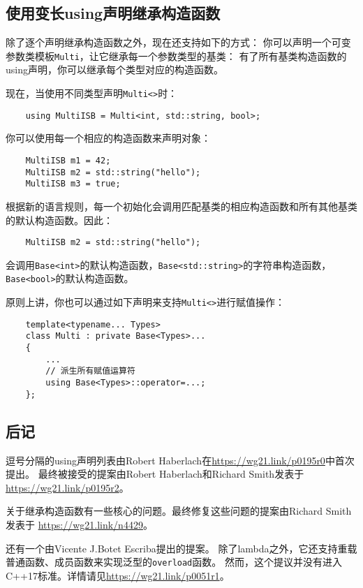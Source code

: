 \subsection{使用变长using声明继承构造函数}
除了逐个声明继承构造函数之外，现在还支持如下的方式：
你可以声明一个可变参数类模板\texttt{Multi}，让它继承每一个参数类型的基类：
有了所有基类构造函数的using声明，你可以继承每个类型对应的构造函数。

现在，当使用不同类型声明\texttt{Multi<>}时：
\begin{lstlisting}
    using MultiISB = Multi<int, std::string, bool>;
\end{lstlisting}
你可以使用每一个相应的构造函数来声明对象：
\begin{lstlisting}
    MultiISB m1 = 42;
    MultiISB m2 = std::string("hello");
    MultiISB m3 = true;
\end{lstlisting}
根据新的语言规则，每一个初始化会调用匹配基类的相应构造函数和所有其他基类的默认构造函数。因此：
\begin{lstlisting}
    MultiISB m2 = std::string("hello");
\end{lstlisting}
会调用\texttt{Base<int>}的默认构造函数，\texttt{Base<std::string>}的字符串构造函数，
\texttt{Base<bool>}的默认构造函数。

原则上讲，你也可以通过如下声明来支持\texttt{Multi<>}进行赋值操作：
\begin{lstlisting}
    template<typename... Types>
    class Multi : private Base<Types>...
    {
        ...
        // 派生所有赋值运算符
        using Base<Types>::operator=...;
    };
\end{lstlisting}

\subsection{后记}
逗号分隔的using声明列表由Robert Haberlach在\url{https://wg21.link/p0195r0}中首次提出。
最终被接受的提案由Robert Haberlach和Richard Smith发表于\url{https://wg21.link/p0195r2}。

关于继承构造函数有一些核心的问题。最终修复这些问题的提案由Richard Smith发表于
\url{https://wg21.link/n4429}。

还有一个由Vicente J.Botet Escriba提出的提案。
除了lambda之外，它还支持重载普通函数、成员函数来实现泛型的\texttt{overload}函数。
然而，这个提议并没有进入C++17标准。详情请见\url{https://wg21.link/p0051r1}。

\setcounter{footnote}{0}